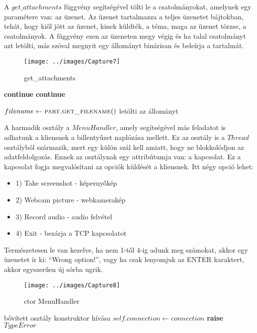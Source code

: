 \documentclass[a4paper, 11pt]{article}
\begin{document}
A $get\_attachments$ függvény segítségével tölti le a csatolmányokat, amelynek egy paramétere van: az üzenet. Az üzenet tartalmazza a teljes üzenetet bájtokban, tehát, hogy kiől jött az üzenet, kinek küldték, a téma, maga az üzenet törzse, a csatolmányok. A függvény ezen az üzeneten megy végig és ha talal csatolmányt azt letölti, más szóval megnyit egy állományt binárisan és beleírja a tartalmát.
\begin{figure}[H]
\centering
\texttt{[image: ../images/Capture7]}
\caption{get\_attachments}
\label{fig:getatt}
\end{figure}

\begin{algorithmic}[H]
			\State \textbf{continue}
		\EndIf
			\State \textbf{continue}
		\EndIf
		
		\State $filename \gets \Call{part.get\_filename}{$$}$
			\State letölti az állományt
		\EndIf
	\EndFor
\EndFunction
\end{algorithmic}

A harmadik osztály a $MenuHandler$, amely segítségével más feladatot is adhatunk a kliensnek a billentyűzet naplózása mellett. Ez az osztály is a $Thread$ osztályból származik, mert egy külön szál kell amiatt, hogy ne blokkolódjon az adatfeldolgozás. Ennek az osztálynak egy attribútumja van: a kapcsolat. Ez a kapcsolat fogja megvalósítani az opciók küldését a kliensnek. Itt négy opció lehet:
\begin{itemize}
\item 1) Take screenshot - képernyőkép
\item 2) Webcam picture - webkamerakép
\item 3) Record audio - audio felvétel
\item 4) Exit - bezárja a TCP kapcsolatot
\end{itemize}
Természetesen le van kezelve, ha nem 1-től 4-ig adunk meg számokat, akkor egy üzenetet ír ki: ``Wrong option!'', vagy ha csak lenyomjuk az ENTER karaktert, akkor egyszerűen új sórba ugrik.
\begin{figure}[H]
\centering
\texttt{[image: ../images/Capture8]}
\caption{ctor MenuHandler}
\label{fig:ctormenu}
\end{figure}

\begin{algorithmic}[H]
	\State bővített osztály konstruktor hívása
		\State $self.connection \gets connection$
	\Else
		\State \textbf{raise} $TypeError$
	\EndIf
\EndFunction
\end{algorithmic}
\end{document}
